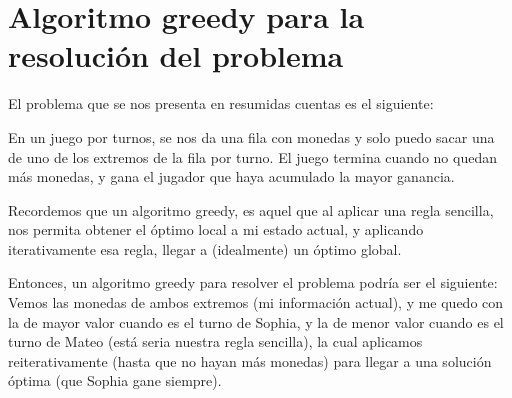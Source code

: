 \section{Algoritmo greedy para la resolución del problema}

El problema que se nos presenta en resumidas cuentas es el siguiente:

En un juego por turnos, se nos da una fila con monedas y solo puedo sacar una de uno de los extremos de la fila por turno. El juego termina cuando no quedan más monedas, y gana el jugador que haya acumulado la mayor ganancia.

Recordemos que un algoritmo greedy, es aquel que al aplicar una regla sencilla, nos permita obtener el óptimo local a mi estado actual, y aplicando iterativamente esa regla, llegar a (idealmente) un óptimo global.

Entonces, un algoritmo greedy para resolver el problema podría ser el siguiente: Vemos las monedas de ambos extremos (mi información actual), y me quedo con la de mayor valor cuando es el turno de Sophia, y la de menor valor cuando es el turno de Mateo (está seria nuestra regla sencilla), la cual aplicamos reiterativamente (hasta que no hayan más monedas) para llegar a una solución óptima (que Sophia gane siempre).